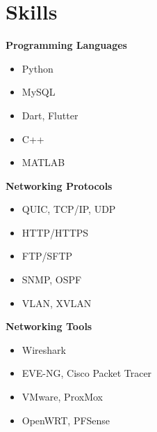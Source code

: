 \section{Skills}

\begin{paracol}{3}
	\begin{onecolentry}
		\textbf{Programming Languages}
		\begin{itemize}[leftmargin=0.5cm, itemsep=0.1cm]
			\item Python
			\item MySQL
			\item Dart, Flutter
			\item C++
			\item MATLAB
		\end{itemize}
	\end{onecolentry}
	\switchcolumn
	
	\begin{onecolentry}
		\textbf{Networking Protocols}
		\begin{itemize}[leftmargin=0.5cm, itemsep=0.1cm]
			\item QUIC, TCP/IP, UDP
			\item HTTP/HTTPS
			\item FTP/SFTP
			\item SNMP, OSPF
			\item VLAN, XVLAN
		\end{itemize}
	\end{onecolentry}
	
	\switchcolumn
	\begin{onecolentry}
		\textbf{Networking Tools}
		\begin{itemize}[leftmargin=0.5cm, itemsep=0.1cm]
			\item Wireshark
			\item EVE-NG, Cisco Packet Tracer
			\item VMware, ProxMox
			\item OpenWRT, PFSense
		\end{itemize}
	\end{onecolentry}
\end{paracol}

\vspace{0.3 cm} %

